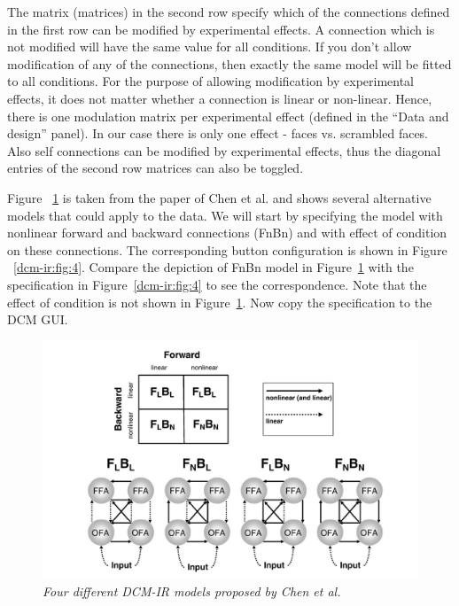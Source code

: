 The matrix (matrices) in the second row specify which of the connections defined in the first row can be modified by experimental effects. A connection which is not modified will have the same value for all conditions. If you don't allow modification of any of the connections, then exactly the same model will be fitted to all conditions. For the purpose of allowing modification by experimental effects, it does not matter whether a connection is linear or non-linear. Hence, there is one modulation matrix per experimental effect (defined in the ``Data and design'' panel). In our case there is only one effect - faces vs. scrambled faces. Also self connections can be modified by experimental effects, thus the diagonal entries of the second row matrices can also be toggled.

Figure ~\ref{dcm-ir:fig:3} is taken from the paper of Chen et al. \cite{cc_asymm} and shows several alternative models that could apply to the data. We will start by specifying the model with nonlinear forward and backward connections (FnBn) and with effect of condition on these connections. The corresponding button configuration is shown in Figure ~\ref{dcm-ir:fig:4}. Compare the depiction of FnBn model in Figure~\ref{dcm-ir:fig:3}  with the specification in Figure~\ref{dcm-ir:fig:4}  to see the correspondence. Note that the effect of condition is not shown in Figure~\ref{dcm-ir:fig:3}. Now copy the specification to the DCM GUI.

\begin{figure}
\begin{center}
\includegraphics[width=160mm]{dcm_ir/figures/irfigure3}
\caption{\em Four different DCM-IR models proposed by Chen et al. \cite{cc_asymm} \label{dcm-ir:fig:3}}
\end{center}
\end{figure}

